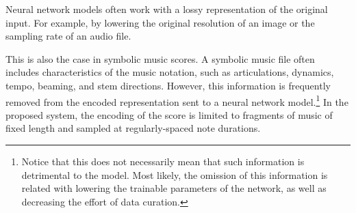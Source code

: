 
Neural network models often work with a lossy representation
of the original input. For example, by lowering the original
resolution of an image or the sampling rate of an audio
file.

This is also the case in symbolic music scores. A symbolic
music file often includes characteristics of the music
notation, such as articulations, dynamics, tempo, beaming,
and stem directions. However, this information is frequently
removed from the encoded representation sent to a neural
network model.\footnote{Notice that this does not
necessarily mean that such information is detrimental to the
model. Most likely, the omission of this information is
related with lowering the trainable parameters of the
network, as well as decreasing the effort of data curation.}
In the proposed system, the encoding of the score is limited
to fragments of music of fixed length and sampled at
regularly-spaced note durations.
